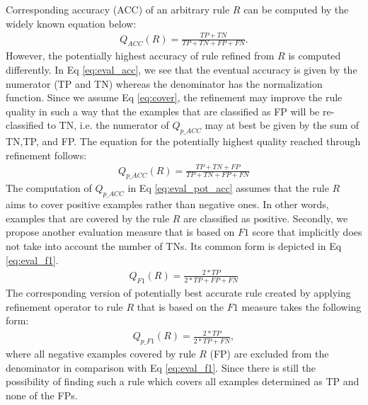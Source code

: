 \documentclass{bmcart}
\begin{document}
Corresponding accuracy (ACC) of an arbitrary rule $R$ can be computed by the widely known equation below:
\begin{eqnarray} \label{eq:eval_acc}
Q_{ACC}(R) = \frac{TP + TN}{TP + TN + FP + FN}.
\end{eqnarray}
However, the potentially highest accuracy of rule refined from $R$ is computed differently. In Eq \ref{eq:eval_acc}, we see that the eventual accuracy is given by the numerator (TP and TN) whereas the denominator has the normalization function. Since we assume Eq \ref{eq:cover}, the refinement may improve the rule quality in such a way that the examples that are classified as FP will be re-classified to TN, i.e. the numerator of $Q_{p\_ACC}$ may at best be given by the sum of TN,TP, and FP. The equation for the potentially highest quality reached through refinement follows:
\begin{eqnarray} \label{eq:eval_pot_acc}
Q_{p\_ACC}(R) = \frac{TP + TN + FP}{TP + TN + FP + FN}
\end{eqnarray}
The computation of $Q_{p\_ACC}$ in Eq \ref{eq:eval_pot_acc} assumes that the rule $R$ aims to cover positive examples rather than negative ones. In other words, examples that are covered by the rule $R$ are classified as positive. Secondly, we propose another evaluation measure that is based on $F1$ score that implicitly does not take into account the number of TNs. Its common form is depicted in Eq \ref{eq:eval_f1}. 
\begin{eqnarray} \label{eq:eval_f1}
    Q_{F1}(R) = \frac{2*TP}{2*TP + FP + FN}
\end{eqnarray}
The corresponding version of potentially best accurate rule created by applying refinement operator to rule $R$ that is based on the $F1$ measure takes the following form:
\begin{eqnarray} \label{eq:eval_pot_f1}
    Q_{p\_F1}(R) = \frac{2*TP}{2*TP + FN},
\end{eqnarray}
where all negative examples covered by rule $R$ (FP) are excluded from the denominator in comparison with Eq \ref{eq:eval_f1}. Since there is still the possibility of finding such a rule which covers all examples determined as TP and none of the FPs.
\end{document}
